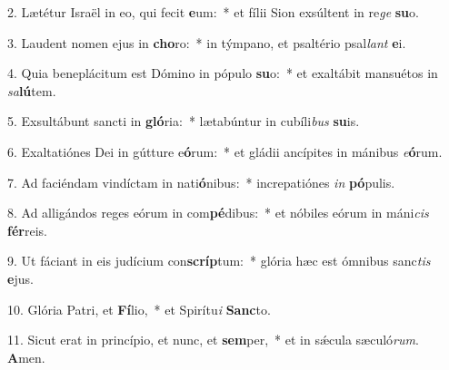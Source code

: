 2. Lætétur Israël in eo, qui fecit \textbf{e}um:~*  et fílii Sion exsúltent in re\textit{ge} \textbf{su}o.\

3. Laudent nomen ejus in \textbf{cho}ro:~*  in týmpano, et psaltério psal\textit{lant} \textbf{e}i.\

4. Quia beneplácitum est Dómino in pópulo \textbf{su}o:~*  et exaltábit mansuétos in \textit{sa}\textbf{lú}tem.\

5. Exsultábunt sancti in \textbf{gló}ria:~*  lætabúntur in cubíli\textit{bus} \textbf{su}is.\

6. Exaltatiónes Dei in gútture e\textbf{ó}rum:~*  et gládii ancípites in mánibus \textit{e}\textbf{ó}rum.\

7. Ad faciéndam vindíctam in nati\textbf{ó}nibus:~*  increpatiónes \textit{in} \textbf{pó}pulis.\

8. Ad alligándos reges eórum in com\textbf{pé}dibus:~*  et nóbiles eórum in máni\textit{cis} \textbf{fér}reis.\

9. Ut fáciant in eis judícium con\textbf{scríp}tum:~*  glória hæc est ómnibus sanc\textit{tis} \textbf{e}jus.\

10. Glória Patri, et \textbf{Fí}lio,~*  et Spirítu\textit{i} \textbf{Sanc}to.\

11. Sicut erat in princípio, et nunc, et \textbf{sem}per,~*  et in sǽcula sæculó\textit{rum}. \textbf{A}men.\

